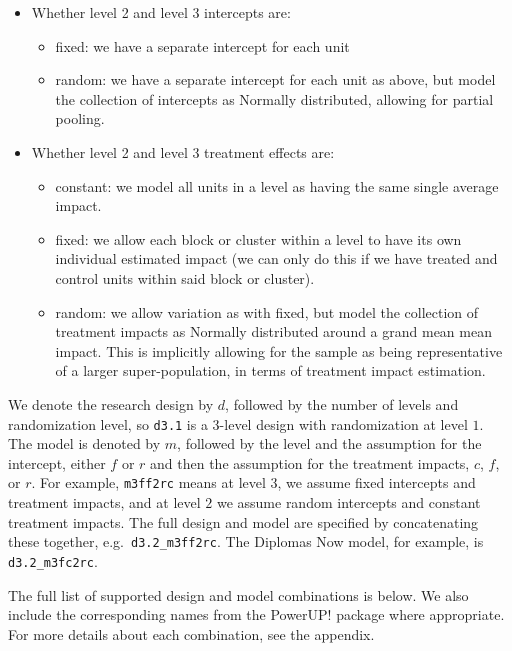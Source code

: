 \documentclass[
]{article}
\providecommand{\tightlist}{%
  \setlength{\itemsep}{0pt}\setlength{\parskip}{0pt}}
\begin{document}
\begin{itemize}
\tightlist
\item
  Whether level 2 and level 3 intercepts are:

  \begin{itemize}
  \tightlist
  \item
    fixed: we have a separate intercept for each unit
  \item
    random: we have a separate intercept for each unit as above, but
    model the collection of intercepts as Normally distributed, allowing
    for partial pooling.
  \end{itemize}
\item
  Whether level 2 and level 3 treatment effects are:

  \begin{itemize}
  \tightlist
  \item
    constant: we model all units in a level as having the same single
    average impact.
  \item
    fixed: we allow each block or cluster within a level to have its own
    individual estimated impact (we can only do this if we have treated
    and control units within said block or cluster).
  \item
    random: we allow variation as with fixed, but model the collection
    of treatment impacts as Normally distributed around a grand mean
    mean impact. This is implicitly allowing for the sample as being
    representative of a larger super-population, in terms of treatment
    impact estimation.
  \end{itemize}
\end{itemize}

We denote the research design by \(d\), followed by the number of levels
and randomization level, so \texttt{d3.1} is a \(3\)-level design with
randomization at level \(1\). The model is denoted by \(m\), followed by
the level and the assumption for the intercept, either \(f\) or \(r\)
and then the assumption for the treatment impacts, \(c\), \(f\), or
\(r\). For example, \texttt{m3ff2rc} means at level \(3\), we assume
fixed intercepts and treatment impacts, and at level \(2\) we assume
random intercepts and constant treatment impacts. The full design and
model are specified by concatenating these together,
e.g.~\texttt{d3.2\_m3ff2rc}. The Diplomas Now model, for example, is
\texttt{d3.2\_m3fc2rc}.

The full list of supported design and model combinations is below. We
also include the corresponding names from the PowerUP! package where
appropriate. For more details about each combination, see the appendix.
\end{document}
